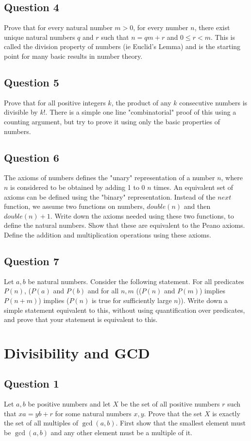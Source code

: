 \documentclass[12pt]{report}
\begin{document}
\section*{Question 4}
Prove that for every natural number $m > 0$, for every number $n$, there exist unique natural numbers $q$ and $r$ such that $n = qm + r$ and $0 \leq r < m$. This
is called the division property of numbers (ie Euclid's Lemma) and is the starting point for many basic results in number theory.
\section*{Question 5}
Prove that for all positive integers $k$, the product of any $k$ consecutive numbers is divisible by $k!$. There is a simple one line "combinatorial" proof of this using a counting argument, but try to prove it using only the basic properties of numbers.
\section*{Question 6}
The axioms of numbers defines the "unary" representation of a number $n$, where $n$ is considered to be obtained by adding 1 to 0 $n$ times.  An equivalent set of axioms can be defined using the "binary" representation. Instead of the $next$ function, we assume two functions on numbers, $double(n)$ and then $double(n) + 1$. Write down the axioms needed using these two functions, to define the natural numbers. Show that these are equivalent to the Peano
axioms. Define the addition and multiplication operations using these axioms.
\section*{Question 7}
Let $a, b$ be natural numbers. Consider the following statement. For all predicates $P(n)$, ($P(a)$ and $P(b)$ and for all $n, m$ (($P(n)$ and $P(m)$) implies $P(n + m)$) implies ($P(n)$ is true for sufficiently large $n$)).  Write down a simple statement equivalent to this, without using quantification over predicates, and prove that your statement is equivalent to this.
\chapter{Divisibility and GCD}
\section*{Question 1}
Let $a, b$ be positive numbers and let $X$ be the set of all positive numbers $r$ such that $xa = yb + r$ for some natural numbers $x, y$. Prove that the set $X$ is exactly the set of all multiples of $\gcd(a, b)$. First show that the smallest element must be $\gcd(a, b)$ and any other element must be a multiple of it.
\end{document}
